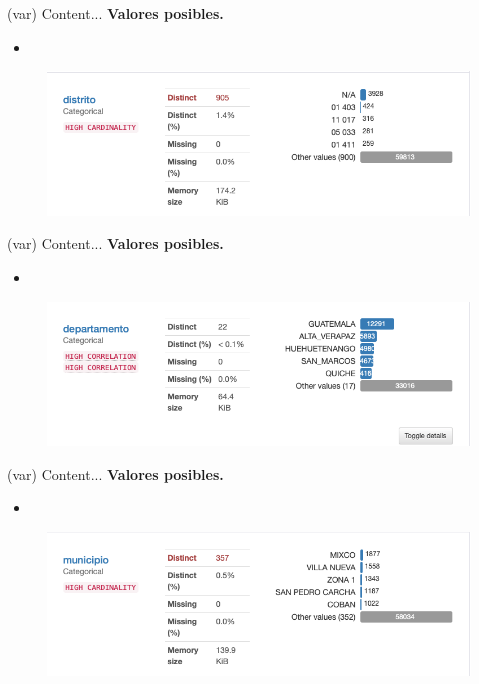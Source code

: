 
\begin{variable}(var) 
	Content... 
	\bigbreak 
	\textbf{Valores posibles.}
	\begin{itemize}
		\item 
	\end{itemize}
	\begin{figure}[H]
		\centering
		\includegraphics[scale=0.5]{Images/2}
	\end{figure}
\end{variable}


\begin{variable}(var) 
Content... 
\bigbreak 
\textbf{Valores posibles.}
\begin{itemize}
	\item 
\end{itemize}
\begin{figure}[H]
	\centering
	\includegraphics[scale=0.5]{Images/3}
\end{figure}
\end{variable}


\begin{variable}(var) 
Content... 
\bigbreak 
\textbf{Valores posibles.}
\begin{itemize}
	\item 
\end{itemize}
\begin{figure}[H]
	\centering
	\includegraphics[scale=0.5]{Images/4}
\end{figure}
\end{variable}

